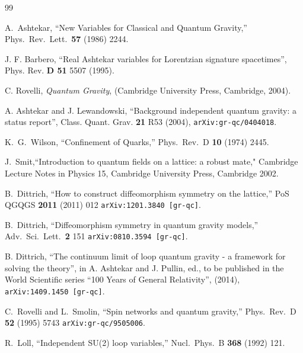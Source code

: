 \documentclass[nofootinbib,superscriptaddress,eqsecnum,tightenlines,11pt]{revtex4-1}
\begin{document}
\begin{thebibliography}{99}\small

\parskip -1pt

A.~Ashtekar,
  ``New Variables for Classical and Quantum Gravity,''
  Phys.\ Rev.\ Lett.\  {\bf 57} (1986) 2244.

J. F. Barbero,
``Real Ashtekar variables for Lorentzian signature spacetimes'',
Phys. Rev. \textbf{D 51} 5507 (1995).

C. Rovelli,
\textit{Quantum Gravity},
(Cambridge University Press, Cambridge, 2004).

 A. Ashtekar and J. Lewandowski,
``Background independent quantum gravity: a status report'',
Class. Quant. Grav. \textbf{21} R53 (2004), \texttt{arXiv:gr-qc/0404018}.

 K.~G.~Wilson,
  ``Confinement of Quarks,''
  Phys.\ Rev.\ D {\bf 10} (1974) 2445.

J.~Smit,``Introduction to quantum fields on a lattice: a robust mate," Cambridge Lecture Notes in Physics 15, Cambridge University Press, Cambridge 2002.

 B.~Dittrich,
  ``How to construct diffeomorphism symmetry on the lattice,''
  PoS QGQGS {\bf 2011} (2011) 012
  \texttt{arXiv:1201.3840 [gr-qc]}.

B.~Dittrich,
  ``Diffeomorphism symmetry in quantum gravity models,''
  Adv.\ Sci.\ Lett.\  {\bf 2} 151
  \texttt{arXiv:0810.3594 [gr-qc]}.

 B. Dittrich,
``The continuum limit of loop quantum gravity - a framework for solving the theory'',
in A. Ashtekar and J. Pullin, ed., to be published in the World Scientific series ``100 Years of General Relativity'',
(2014), \texttt{arXiv:1409.1450 [gr-qc]}.

 C.~Rovelli and L.~Smolin,
  ``Spin networks and quantum gravity,''
  Phys.\ Rev.\ D {\bf 52} (1995) 5743
  \texttt{arXiv:gr-qc/9505006}.

R.~Loll,
  ``Independent SU(2) loop variables,''
  Nucl.\ Phys.\ B {\bf 368} (1992) 121.


\end{thebibliography}
\end{document}

